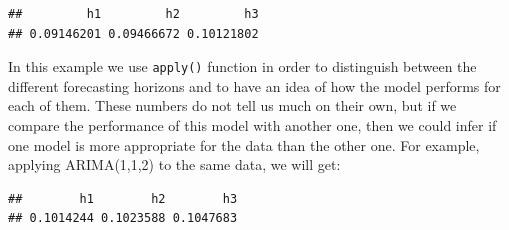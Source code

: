 \documentclass[
]{book}
\newenvironment{Shaded}{\begin{snugshade}}{\end{snugshade}}
\newcommand{\AttributeTok}[1]{\textcolor[rgb]{0.77,0.63,0.00}{#1}}
\newcommand{\ConstantTok}[1]{\textcolor[rgb]{0.00,0.00,0.00}{#1}}
\newcommand{\DecValTok}[1]{\textcolor[rgb]{0.00,0.00,0.81}{#1}}
\newcommand{\FunctionTok}[1]{\textcolor[rgb]{0.00,0.00,0.00}{#1}}
\newcommand{\NormalTok}[1]{#1}
\newcommand{\OtherTok}[1]{\textcolor[rgb]{0.56,0.35,0.01}{#1}}
\newcommand{\SpecialCharTok}[1]{\textcolor[rgb]{0.00,0.00,0.00}{#1}}
\newcommand{\StringTok}[1]{\textcolor[rgb]{0.31,0.60,0.02}{#1}}
\theoremstyle{definition}
\theoremstyle{definition}
\theoremstyle{definition}
\theoremstyle{definition}
\theoremstyle{remark}
\begin{document}
\begin{Shaded}
\end{Shaded}

\begin{verbatim}
##         h1         h2         h3 
## 0.09146201 0.09466672 0.10121802
\end{verbatim}

In this example we use \texttt{apply()} function in order to distinguish between the different forecasting horizons and to have an idea of how the model performs for each of them. These numbers do not tell us much on their own, but if we compare the performance of this model with another one, then we could infer if one model is more appropriate for the data than the other one. For example, applying ARIMA(1,1,2) to the same data, we will get:

\begin{Shaded}
\end{Shaded}

\begin{verbatim}
##        h1        h2        h3 
## 0.1014244 0.1023588 0.1047683
\end{verbatim}
\end{document}
